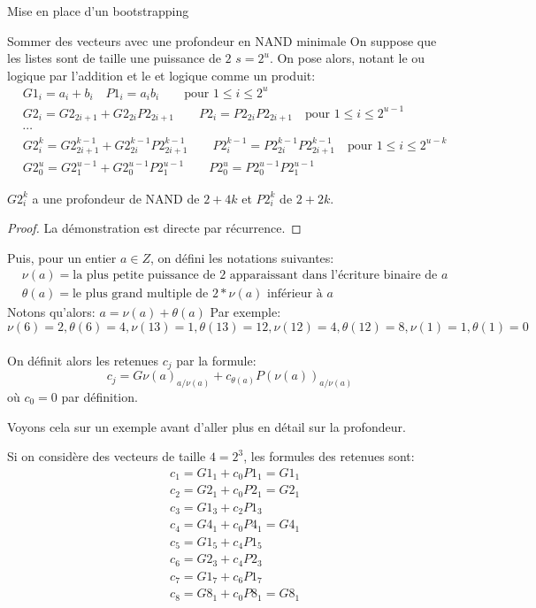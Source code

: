 \begin{section}{Mise en place d'un bootstrapping}
\begin{subsection}{Sommer des vecteurs avec une profondeur en NAND minimale}
On suppose que les listes sont de  taille une puissance de $2$ $s = 2^u$. 
On pose alors, notant le ou logique par l'addition et le et logique comme un
produit:
\begin{align*}
&{G1}_i = a_i +  b_i\quad {P1}_i = a_i b_i \qquad \text{pour $1 \leq i
\leq 2^u$}\\
&{G2}_i = {G2}_{2i + 1} + {G2}_{2i}{P2}_{2i + 1}\qquad {P2}_i = {P2}_{2i}
{P2}_{2i + 1} \quad \text{pour $1 \leq i \leq 2^{u-1}$}\\
&\cdots \\
&{G2^k_i} = {G2^{k-1}_{2i + 1}} + {G2^{k-1}_{2i}}{P2^{k-1}_{2i + 1}}\qquad
{P2^{k-1}_i} = {P2^{k-1}_{2i}} {P2^{k-1}_{2i + 1}} \quad \text{pour $1 \leq i
\leq 2^{u-k}$}\\
&{G2^u_0} = {G2^{u-1}_{1}} + {G2^{u-1}_{0}}{P2^{u-1}_{1}}\qquad
{P2^{u}_0} = {P2^{u-1}_{0}} {P2^{u-1}_{1}} 
\end{align*}
\begin{prop} \label{g_et_p}
$G2^k_i$ a une profondeur de NAND de $2 + 4k$ et 
$P2^k_i$ de $2 + 2k$.
\end{prop}
\begin{proof}
La démonstration est directe par récurrence. 
\end{proof}

Puis, pour un entier $a \in Z$, on défini les notations suivantes:
\begin{align*}
&\nu(a) = \text{la plus petite puissance de $2$ apparaissant dans l'écriture
binaire de $a$}\\
&\theta(a) = \text{le plus grand multiple de $2*\nu(a)$ inférieur à $a$}
\end{align*}
Notons qu'alors: $a = \nu(a) + \theta(a)$
Par exemple: 
\[\nu(6) = 2, \theta(6) = 4, \nu(13) = 1, \theta(13) = 12, \nu(12)
= 4, \theta(12) = 8, \nu(1) = 1, \theta(1) = 0\]
\paragraph{}
On définit alors les retenues $c_j$ par la formule:
\[c_j = {G\nu(a)}_{a/\nu(a)} + c_{\theta(a)} {P(\nu(a))}_{a/\nu(a)}\]
où $c_0 = 0$ par définition.

Voyons cela sur un exemple avant d'aller plus en détail sur la profondeur.

Si on considère des vecteurs de taille $4 = 2^3$, les formules des retenues
sont:
\begin{align*}
&c_1 = {G1_1} + c_0 {P1_1} = {G1_1} \\
&c_2 = {G2_1} + c_0 {P2_1} = {G2_1}  \\
&c_3 = {G1_3} + c_2 {P1_3}\\
&c_4 = {G4_1} + c_0 {P4_1} = {G4_1} \\
&c_5 = {G1_5} + c_4 {P1_5}\\
&c_6 = {G2_3} + c_4 {P2_3} \\
&c_7 = {G1_7} + c_6 {P1_7} \\
&c_8 = {G8_1} + c_0 {P8_1} = {G8_1} \\
\end{align*}


\end{subsection}
\end{section}
